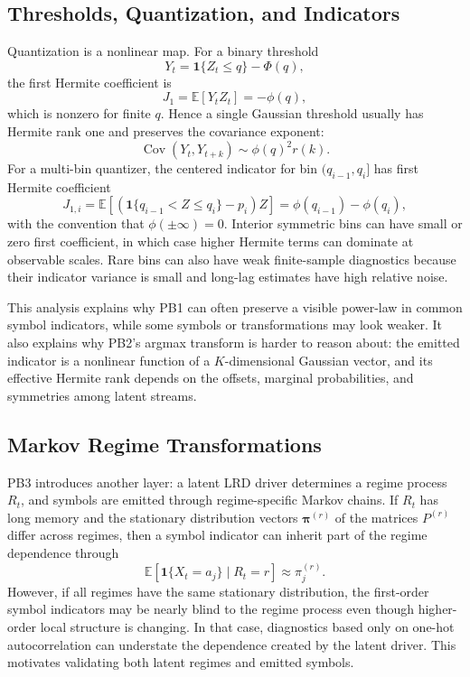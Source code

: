 \documentclass[journal]{IEEEtran}
\newcommand{\vect}[1]{\boldsymbol{#1}}
\begin{document}
\subsection{Thresholds, Quantization, and Indicators}

Quantization is a nonlinear map. For a binary threshold
\begin{equation}
  Y_t=\mathbf{1}\{Z_t\le q\}-\Phi(q),
\end{equation}
the first Hermite coefficient is
\begin{equation}
  J_1 = \mathbb{E}[Y_t Z_t] = -\phi(q),
\end{equation}
which is nonzero for finite $q$. Hence a single Gaussian threshold usually has
Hermite rank one and preserves the covariance exponent:
\begin{equation}
  \operatorname{Cov}(Y_t,Y_{t+k}) \sim \phi(q)^2 r(k).
\end{equation}
For a multi-bin quantizer, the centered indicator for bin
\((q_{i-1},q_i]\) has first Hermite coefficient
\begin{equation}
  J_{1,i} =
  \mathbb{E}\left[
      \left(\mathbf{1}\{q_{i-1}<Z\le q_i\}-p_i\right)Z
  \right]
  =
  \phi(q_{i-1})-\phi(q_i),
\end{equation}
with the convention that $\phi(\pm\infty)=0$. Interior symmetric bins can have
small or zero first coefficient, in which case higher Hermite terms can dominate
at observable scales. Rare bins can also have weak finite-sample diagnostics
because their indicator variance is small and long-lag estimates have high
relative noise.

This analysis explains why PB1 can often preserve a visible power-law in common
symbol indicators, while some symbols or transformations may look weaker. It
also explains why PB2's argmax transform is harder to reason about: the emitted
indicator is a nonlinear function of a $K$-dimensional Gaussian vector, and its
effective Hermite rank depends on the offsets, marginal probabilities, and
symmetries among latent streams.

\subsection{Markov Regime Transformations}

PB3 introduces another layer: a latent LRD driver determines a regime process
$R_t$, and symbols are emitted through regime-specific Markov chains. If
\(R_t\) has long memory and the stationary distribution vectors
\(\vect{\pi}^{(r)}\) of the
matrices $P^{(r)}$ differ across regimes, then a symbol indicator can inherit
part of the regime dependence through
\begin{equation}
  \mathbb{E}[\mathbf{1}\{X_t=a_j\}\mid R_t=r]\approx \pi^{(r)}_j.
\end{equation}
However, if all regimes have the same stationary distribution, the first-order
symbol indicators may be nearly blind to the regime process even though
higher-order local structure is changing. In that case, diagnostics based only
on one-hot autocorrelation can understate the dependence created by the latent
driver. This motivates validating both latent regimes and emitted symbols.
\end{document}
